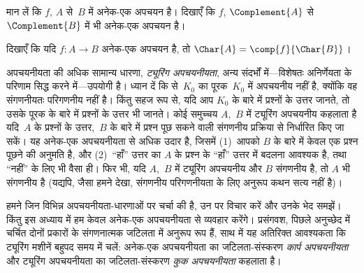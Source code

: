 \documentclass[../../../include/open-logic-section]{subfiles}
\begin{document}
\begin{prob}
मान लें कि $f$, $A$ से~$B$ में अनेक-एक अपचयन है। दिखाएँ कि $f$,
$\Complement{A}$ से $\Complement{B}$ में भी अनेक-एक अपचयन है।
\end{prob}

\begin{prob}
दिखाएँ कि यदि $f\colon A \to B$ अनेक-एक अपचयन है, तो $\Char{A}
= \comp{f}{\Char{B}}$।
\end{prob}

\begin{digress}
अपचयनीयता की अधिक सामान्य धारणा, \emph{ट्यूरिंग अपचयनीयता}, अन्य
संदर्भों में—विशेषतः अनिर्णेयता के परिणाम सिद्ध करने में—उपयोगी है।
ध्यान दें कि  से~$K_0$ का पूरक~$K_0$ में अपचयनीय
नहीं है, क्योंकि वह संगणनीयतः परिगणनीय नहीं है। किंतु सहज रूप से, यदि
आप $K_0$ के बारे में प्रश्नों के उत्तर जानते, तो उसके पूरक के बारे में
प्रश्नों के उत्तर भी जानते। कोई समुच्चय $A$,~$B$ में ट्यूरिंग अपचयनीय
कहलाता है यदि~$A$ के प्रश्नों के उत्तर,~$B$ के बारे में प्रश्न पूछ सकने
वाली संगणनीय प्रक्रिया से निर्धारित किए जा सकें। यह अनेक-एक अपचयनीयता
से अधिक उदार है, जिसमें (1)~आपको $B$ के बारे में केवल एक प्रश्न पूछने
की अनुमति है, और (2)~``हाँ'' उत्तर का $A$ के प्रश्न के ``हाँ'' उत्तर में
बदलना आवश्यक है, तथा ``नहीं'' के लिए भी वैसा ही। फिर भी, यदि $A$,~$B$
में ट्यूरिंग अपचयनीय और $B$ संगणनीय है, तो $A$ भी संगणनीय है (यद्यपि,
जैसा हमने देखा, संगणनीय परिगणनीयता के लिए अनुरूप कथन सत्य नहीं है)।

हमने जिन विभिन्न अपचयनीयता-धारणाओं पर चर्चा की है, उन पर विचार करें और
उनके भेद समझें। किंतु इस अध्याय में हम केवल अनेक-एक अपचयनीयता से व्यवहार
करेंगे। प्रसंगवश, पिछले अनुच्छेद में चर्चित दोनों प्रकारों के संगणनात्मक
जटिलता में अनुरूप रूप हैं, साथ में यह अतिरिक्त आवश्यकता कि ट्यूरिंग
मशीनें बहुपद समय में चलें: अनेक-एक अपचयनीयता का जटिलता-संस्करण
\emph{कार्प अपचयनीयता} और ट्यूरिंग अपचयनीयता का जटिलता-संस्करण
\emph{कुक अपचयनीयता} कहलाता है।
\end{digress}
\end{document}
